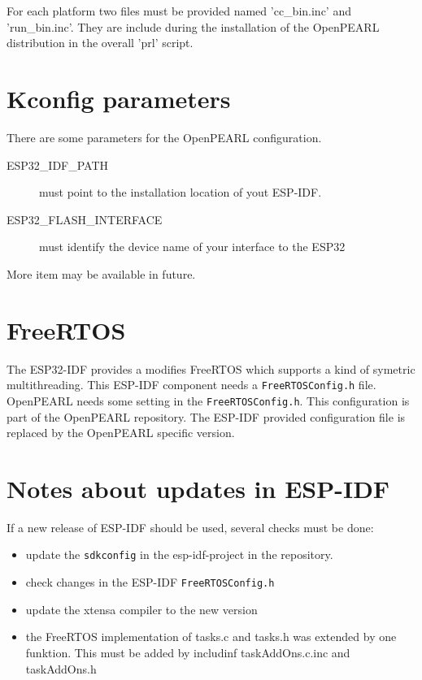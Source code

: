 For each platform two files must be provided named 'cc\_bin.inc'
and 'run\_bin.inc'. They are include during the installation of the OpenPEARL
distribution in the overall 'prl' script.

\section{Kconfig parameters}
There are some parameters for the OpenPEARL configuration.
\begin{description}
\item[ESP32\_IDF\_PATH] must point to the installation location of yout ESP-IDF.
\item[ESP32\_FLASH\_INTERFACE] must identify the device name
   of your interface to the ESP32
\end{description}
More item may be available in future.

\section{FreeRTOS}
The ESP32-IDF provides a modifies FreeRTOS which supports a kind of 
symetric multithreading.
This ESP-IDF component needs a \verb|FreeRTOSConfig.h| file.
OpenPEARL needs some setting in the \verb|FreeRTOSConfig.h|. 
This configuration is part of the OpenPEARL repository. The ESP-IDF provided
configuration file is replaced by the OpenPEARL specific version.

\section{Notes about updates in ESP-IDF}
If a new release of ESP-IDF should be used, several checks must be done:
\begin{itemize}
\item update the \verb|sdkconfig| in the esp-idf-project in the repository.
\item check changes in the ESP-IDF \verb|FreeRTOSConfig.h|
\item update the xtensa compiler to the new version
\item the FreeRTOS implementation of tasks.c and tasks.h was extended by one
  funktion. This must be added by includinf taskAddOns.c.inc and taskAddOns.h
\end{itemize}
